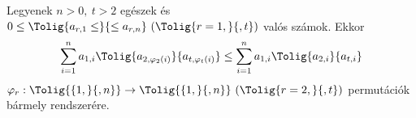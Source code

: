 Legyenek $n>0,\ t>2$ egészek és 
$0\le\Tolig{a_{r,1}\le}{\le a_{r,n}} \ (\Tolig{r=1,}{,t})$ valós számok.
Ekkor 
$$
\sum_{i=1}^{n} a_{1,i}\Tolig{a_{2,\varphi_{2}(i)}}{a_{t,\varphi_{t}(i)}} \le 
\sum_{i=1}^{n} a_{1,i}\Tolig{a_{2,i}}{a_{t,i}}
$$
$\varphi_{r}:\Tolig{\{1,}{,n\}}\to\Tolig{\{1,}{,n\}} \ (\Tolig{r=2,}{,t})$ permutációk bármely rendszerére.
